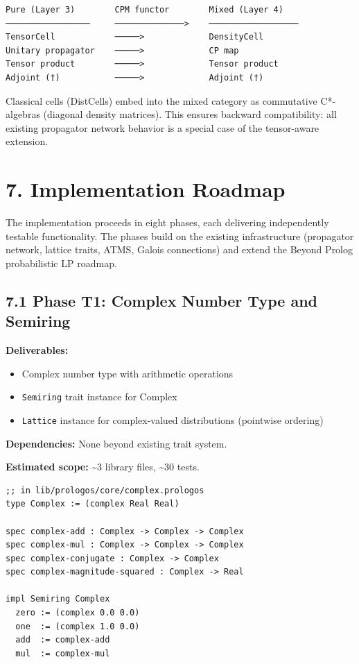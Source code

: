 \documentclass[11pt]{article}
\begin{document}
\begin{verbatim}
Pure (Layer 3)        CPM functor        Mixed (Layer 4)
─────────────────     ──────────────>    ──────────────────
TensorCell            ─────>             DensityCell
Unitary propagator    ─────>             CP map
Tensor product        ─────>             Tensor product
Adjoint (†)           ─────>             Adjoint (†)
\end{verbatim}

Classical cells (DistCells) embed into the mixed category as commutative
C*-algebras (diagonal density matrices). This ensures backward compatibility:
all existing propagator network behavior is a special case of the tensor-aware
extension.
\section{7. Implementation Roadmap}
\label{sec:org08f531e}

The implementation proceeds in eight phases, each delivering independently
testable functionality. The phases build on the existing infrastructure
(propagator network, lattice traits, ATMS, Galois connections) and extend the
Beyond Prolog probabilistic LP roadmap.
\subsection{7.1 Phase T1: Complex Number Type and Semiring}
\label{sec:org3ac31b2}

\textbf{Deliverables:}
\begin{itemize}
\item Complex number type with arithmetic operations
\item \texttt{Semiring} trait instance for Complex
\item \texttt{Lattice} instance for complex-valued distributions (pointwise ordering)
\end{itemize}

\textbf{Dependencies:} None beyond existing trait system.

\textbf{Estimated scope:} \textasciitilde{}3 library files, \textasciitilde{}30 tests.

\begin{verbatim}
;; in lib/prologos/core/complex.prologos
type Complex := (complex Real Real)

spec complex-add : Complex -> Complex -> Complex
spec complex-mul : Complex -> Complex -> Complex
spec complex-conjugate : Complex -> Complex
spec complex-magnitude-squared : Complex -> Real

impl Semiring Complex
  zero := (complex 0.0 0.0)
  one  := (complex 1.0 0.0)
  add  := complex-add
  mul  := complex-mul
\end{verbatim}
\end{document}
